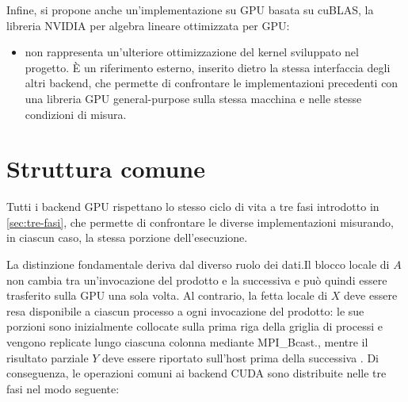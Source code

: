 Infine, si propone anche un'implementazione su GPU basata su cuBLAS, la libreria NVIDIA per algebra lineare ottimizzata per GPU:

\begin{itemize}
    \item \textbf{} non rappresenta un'ulteriore ottimizzazione
    del kernel sviluppato nel progetto. È un riferimento esterno, inserito
    dietro la stessa interfaccia degli altri backend, che permette di
    confrontare le implementazioni precedenti con una libreria GPU
    general-purpose sulla stessa macchina e nelle stesse condizioni di
    misura.
\end{itemize}

\section{Struttura comune}

Tutti i backend GPU rispettano lo stesso ciclo di vita a tre fasi introdotto
in \cref{sec:tre-fasi}, che permette di confrontare
le diverse implementazioni misurando, in ciascun caso, la stessa porzione
dell'esecuzione.

La distinzione fondamentale deriva dal diverso ruolo dei dati.Il blocco
locale di $A$ non cambia tra un'invocazione del prodotto e la successiva e
può quindi essere trasferito sulla GPU una sola volta. Al contrario,
la fetta locale di \(X\) deve essere resa disponibile a ciascun processo
a ogni invocazione del prodotto: le sue porzioni sono inizialmente collocate
sulla prima riga della griglia di processi e vengono replicate lungo ciascuna
colonna mediante MPI_Bcast., mentre il risultato parziale $Y$ deve essere riportato
sull'host prima della successiva .
Di conseguenza, le operazioni comuni ai
backend CUDA sono distribuite nelle tre fasi nel modo seguente:

